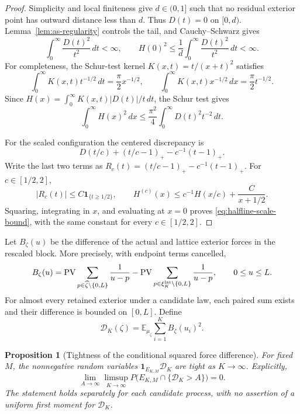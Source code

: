 \documentclass[11pt,reqno]{amsart}
\numberwithin{equation}{section}
\newtheorem{proposition}[theorem]{Proposition}
\theoremstyle{definition}
\theoremstyle{remark}
\newcommand{\E}{\mathbb E}
\newcommand{\1}{\mathbf 1}
\newcommand{\PV}{\operatorname{PV}}
\newcommand{\dd}{\,d}
\begin{document}
\begin{proof}
Simplicity and local finiteness give $d\in(0,1]$ such that no
residual exterior point has outward distance less than $d$. Thus
$D(t)=0$ on $[0,d)$. Lemma~\ref{lem:as-regularity} controls the tail,
and Cauchy--Schwarz gives
\[
\int_0^\infty\frac{D(t)^2}{t^2}\dd t<\infty,
\qquad
H(0)^2\le\frac1d\int_0^\infty\frac{D(t)^2}{t^2}\dd t<\infty.
\]
For completeness, the Schur-test kernel $K(x,t)=t/(x+t)^2$ satisfies
\[
\int_0^\infty K(x,t)t^{-1/2}\dd t=\frac\pi2x^{-1/2},\qquad
\int_0^\infty K(x,t)x^{-1/2}\dd x=\frac\pi2t^{-1/2}.
\]
Since $H(x)=\int_0^\infty K(x,t)|D(t)|/t\dd t$, the Schur test gives
\begin{equation}\label{eq:hardy}
\int_0^\infty H(x)^2\dd x
\le\frac{\pi^2}{4}\int_0^\infty D(t)^2t^{-2}\dd t.
\end{equation}

For the scaled configuration the centered discrepancy is
\[
D(t/c)+(t/c-1)_+-c^{-1}(t-1)_+.
\]
Write the last two terms as
$R_c(t)=(t/c-1)_+-c^{-1}(t-1)_+$. For $c\in[1/2,2]$,
\[
|R_c(t)|\le C\1_{\{t\ge1/2\}},\qquad
H^{(c)}(x)\le c^{-1}H(x/c)+\frac C{x+1/2}.
\]
Squaring, integrating in $x$, and evaluating at $x=0$ proves
\eqref{eq:halfline-scale-bound}, with the same constant for every
$c\in[1/2,2]$.
\end{proof}

Let $B_\zeta(u)$ be the difference of the actual and lattice exterior
forces in the rescaled block. More precisely, with endpoint terms
cancelled,
\[
B_\zeta(u)=\PV\sum_{p\in\widehat\zeta\setminus\{0,L\}}\frac1{u-p}
-\PV\sum_{p\in\xi_K^{\rm lat}\setminus\{0,L\}}\frac1{u-p},
\qquad 0\le u\le L.
\]
For almost every retained exterior under a candidate law, each paired
sum exists and their difference is bounded on $[0,L]$. Define
\begin{equation}\label{eq:Dcost}
\mathcal D_K(\zeta)=
\E_{\mu_\zeta}\sum_{i=1}^K B_\zeta(u_i)^2.
\end{equation}

\begin{samepage}
\begin{proposition}[Tightness of the conditional squared force difference]\label{prop:force}
For fixed $M$, the nonnegative random variables
$\1_{E_{K,M}}\mathcal D_K$ are tight as $K\to\infty$. Explicitly,
\begin{equation}\label{eq:force-tight-tail}
\lim_{A\to\infty}\limsup_{K\to\infty}
P\bigl(E_{K,M}\cap\{\mathcal D_K>A\}\bigr)=0.
\end{equation}
The statement holds separately for each candidate process, with no
assertion of a uniform first moment for $\mathcal D_K$.
\end{proposition}
\end{samepage}
\end{document}
